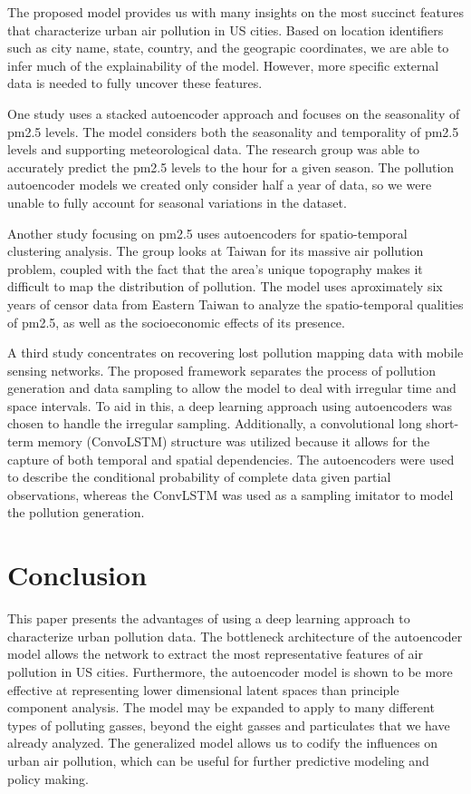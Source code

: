 \documentclass{article}
\begin{document}
\par The proposed model provides us with many insights on the most succinct features that characterize urban air pollution in US cities. Based on location identifiers such as city name, state, country, and the geograpic coordinates, we are able to infer much of the explainability of the model. However, more specific external data is needed to fully uncover these features. 
\par One study \parencite{Bai2019} uses a stacked autoencoder approach and focuses on the seasonality of pm2.5 levels. The model considers both the seasonality and temporality of pm2.5 levels and supporting meteorological data. The research group was able to accurately predict the pm2.5 levels to the hour for a given season. The pollution autoencoder models we created only consider half a year of data, so we were unable to fully account for seasonal variations in the dataset.
\par Another study focusing on pm2.5 \parencite{Doreswamy2021} uses autoencoders for spatio-temporal clustering analysis. The group looks at Taiwan for its massive air pollution problem, coupled with the fact that the area's unique topography makes it difficult to map the distribution of pollution. The model uses aproximately six years of censor data from Eastern Taiwan to analyze the spatio-temporal qualities of pm2.5, as well as the socioeconomic effects of its presence.
\par A third study \parencite{Ma2019} concentrates on recovering lost pollution mapping data with mobile sensing networks. The proposed framework separates the process of pollution generation and data sampling to allow the model to deal with irregular time and space intervals. To aid in this, a deep learning approach using autoencoders was chosen to handle the irregular sampling. Additionally, a convolutional long short-term memory (ConvoLSTM) structure was utilized because it allows for the capture of both temporal and spatial dependencies. The autoencoders were used to describe the conditional probability of complete data given partial observations, whereas the ConvLSTM was used as a sampling imitator to model the pollution generation.

\section{Conclusion}

\par This paper presents the advantages of using a deep learning approach to characterize urban pollution data. The bottleneck architecture of the autoencoder model allows the network to extract the most representative features of air pollution in US cities. Furthermore, the autoencoder model is shown to be more effective at representing lower dimensional latent spaces than principle component analysis. The model may be expanded to apply to many different types of polluting gasses, beyond the eight gasses and particulates that we have already analyzed. The generalized model allows us to codify the influences on urban air pollution, which can be useful for further predictive modeling and policy making.

\printbibliography
\end{document}
